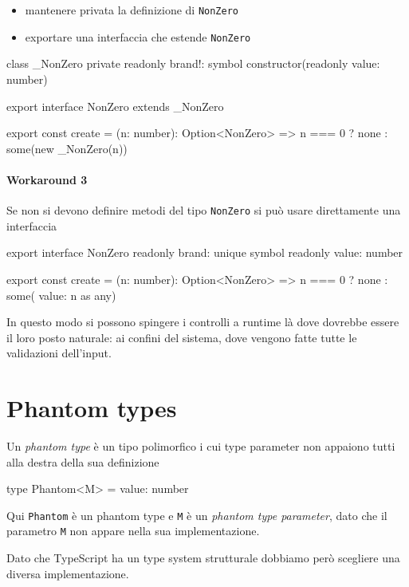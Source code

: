 \documentclass[12pt]{article}
\theoremstyle{definition}
\newenvironment{code}
  {\vspace{0.5cm} \VerbatimEnvironment\begin{typescriptcode}}
  {\end{typescriptcode} \vspace{0.2cm}}
\begin{document}
\begin{itemize}
\item mantenere privata la definizione di \texttt{NonZero}
\item exportare una interfaccia che estende \texttt{NonZero}
\end{itemize}

\begin{code}
class _NonZero {
  private readonly brand!: symbol
  constructor(readonly value: number) {}
}

export interface NonZero extends _NonZero {}

export const create = (n: number): Option<NonZero> =>
  n === 0 ? none : some(new _NonZero(n))
\end{code}

\paragraph{Workaround 3}

Se non si devono definire metodi del tipo \texttt{NonZero} si può usare direttamente una interfaccia

\begin{code}
export interface NonZero {
  readonly brand: unique symbol
  readonly value: number
}

export const create = (n: number): Option<NonZero> =>
  n === 0 ? none : some({ value: n } as any)
\end{code}

In questo modo si possono spingere i controlli a runtime là dove dovrebbe essere il loro posto naturale: ai confini del sistema,
dove vengono fatte tutte le validazioni dell'input.

\newpage
\section{Phantom types}

Un \emph{phantom type} è un tipo polimorfico i cui type parameter non appaiono tutti alla destra della sua definizione

\begin{code}
type Phantom<M> = { value: number }
\end{code}

Qui \texttt{Phantom} è un phantom type e \texttt{M} è un \emph{phantom type parameter},
dato che il parametro \texttt{M} non appare nella sua implementazione.

Dato che TypeScript ha un type system strutturale dobbiamo però scegliere una diversa implementazione.
\end{document}
